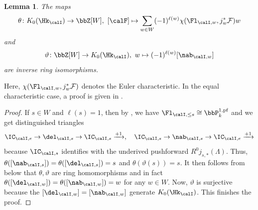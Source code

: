 \documentclass[10pt, reqno]{amsart}
\theoremstyle{plain}
\newtheorem{lemma}[theorem]{Lemma}
\theoremstyle{definition}
\numberwithin{equation}{section}
\begin{document}
	\begin{lemma}
		\label{sec:k_0-i-equivariant-1-description-of-k-0-of-i-equivariant-sheaves}
		The maps
		\begin{equation}
			\theta\colon K_0(\Hk_{\calI})\to \bbZ[W],\ [\calF]\mapsto \sum\limits_{w\in W}(-1)^{\ell(w)} \chi(\Fl_{\calI,w}, j_w^\ast \mathcal{F})w  
		\end{equation}
		and
		\begin{equation}
			\vartheta\colon \bbZ[W]\to K_0(\Hk_{\calI}),\ w\mapsto (-1)^{\ell(w)}[\nab_{\calI,w}] 
		\end{equation}
		are inverse ring isomorphisms.
	\end{lemma}
	Here, $\chi(\Fl_{\calI,w},j_w^*\mathcal{F})$ denotes the Euler characteristic. In the equal characteristic case, a proof is given in \cite[Lemma 5.2.1]{AR}.
	\begin{proof}
		If $s\in W$ and $\ell(s)=1$, then by , we have $\Fl_{\calI, \leq s}\cong \bbP^{1,\rm{pf}}_{k}$ and we get distinguished triangles
		$$
		\IC_{\calI,e}\rightarrow \del_{\calI,s}\rightarrow\IC_{\calI,s}\xrightarrow{+1},\quad \IC_{\calI,s}\rightarrow \nab_{\calI,s}\rightarrow \IC_{\calI,e}\xrightarrow{+1}
		$$
		because $\IC_{\calI,s}$ identifies with the underived pushforward $R^0j_{s,\ast}(\Lambda)$.
		Thus, $\theta([\nab_{\calI,s}])=\theta([\del_{\calI,s}])=s$ and $\theta(\vartheta(s))=s$. It then follows from  below that $\theta, \vartheta$ are ring homomorphisms and in fact $\theta([\del_{\calI,w}])=\theta([\nab_{\calI,w}])=w$ for any $w\in W$. Now, $\vartheta$ is surjective because the $[\del_{\calI,w}]=[\nab_{\calI,w}]$ generate $K_0(\Hk_{\calI})$. This finishes the proof.
	\end{proof}
	
	
	
\end{document}
